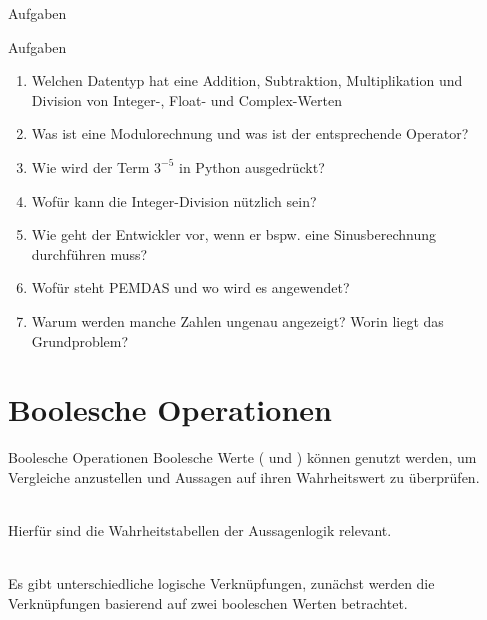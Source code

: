         \begin{subsection}{Aufgaben}
        
            \begin{frame}{Aufgaben}
                \begin{enumerate}
                    \item Welchen Datentyp hat eine Addition, Subtraktion, Multiplikation und Division von Integer-, Float- und Complex-Werten
                    \item Was ist eine Modulorechnung und was ist der entsprechende Operator?
                    \item Wie wird der Term $3^{-5}$ in Python ausgedrückt?
                    \item Wofür kann die Integer-Division nützlich sein?
                    \item Wie geht der Entwickler vor, wenn er bspw. eine Sinusberechnung durchführen muss?
                    \item Wofür steht PEMDAS und wo wird es angewendet?
                    \item Warum werden manche Zahlen ungenau angezeigt? Worin liegt das Grundproblem?
                \end{enumerate}
            \end{frame}
        \end{subsection}
        
        
    \section{Boolesche Operationen}
    
        \begin{frame}[fragile]{Boolesche Operationen}
            Boolesche Werte ( und ) können genutzt werden, um Vergleiche anzustellen und Aussagen auf ihren Wahrheitswert zu überprüfen. \\~\
            
            Hierfür sind die Wahrheitstabellen der Aussagenlogik relevant. \\~\
            
            Es gibt unterschiedliche logische Verknüpfungen, zunächst werden die Verknüpfungen basierend auf zwei booleschen Werten betrachtet.
            
        \end{frame}
        
